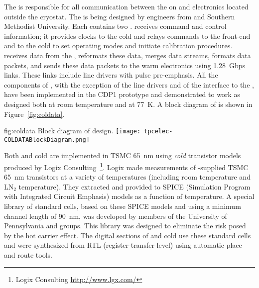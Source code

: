 The   is responsible for all communication between the %
 on  and electronics located outside the cryostat.  The   is being designed by engineers from \fnal and Southern Methodist University.  Each  contains two  .   receives command and control information; it provides clocks to the cold   and relays commands to the  front-end and to the cold   to set operating modes and initiate calibration procedures.   receives data from the  , reformats these data, merges data streams, formats data packets, and sends these data packets to the warm electronics using \SI{1.28}{Gbps} links.  These links include line drivers with pulse pre-emphasis.  All the components of , with the exception of the line drivers and of the interface to the , have been implemented in the CDP1 prototype  and demonstrated to work as designed both at room temperature and at \SI{77}{K}.  A block diagram of  is shown in Figure~\ref{fig:coldata}.  

\begin{dunefigure}
{fig:coldata}
{Block diagram of   design.}
\texttt{[image: tpcelec-COLDATABlockDiagram.png]}
\end{dunefigure}

Both  and cold  are implemented in TSMC \SI{65}{nm}  using \textit{cold} transistor models produced by Logix Consulting~\footnote{Logix Consulting\texttrademark{} \url{http://www.lgx.com/}}.  Logix made measurements of \fnal-supplied TSMC \SI{65}{nm} transistors at a variety of temperatures (including room temperature and LN$_2$ temperature).  They extracted and provided to \fnal SPICE (Simulation Program with Integrated Circuit Emphasis) models as a function of temperature.  A special library of standard cells, based on these SPICE models and using a minimum channel length of \SI{90}{nm}, was developed by members of the University of Pennsylvania and \fnal groups.  This library was designed to eliminate the risk posed by the hot carrier effect.  The digital sections of  and cold  use these standard cells and were synthesized from RTL (register-transfer level) using automatic place and route tools.
